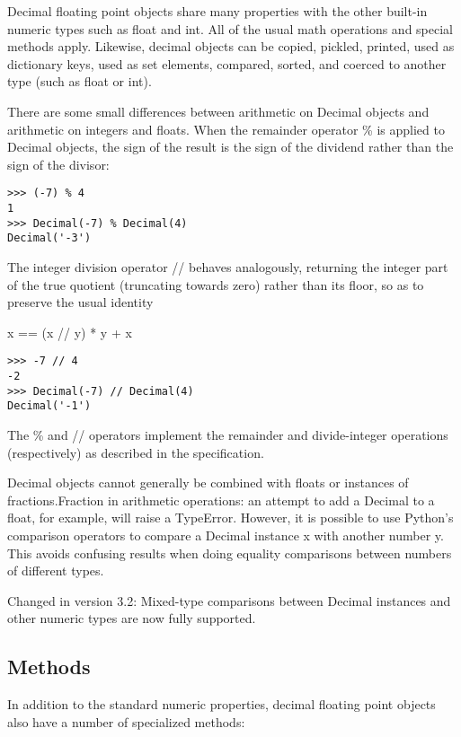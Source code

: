 \vpara
Decimal floating point objects share many properties with the other built-in numeric types such as float and int. All of the usual math operations and special methods apply. Likewise, decimal objects can be copied, pickled, printed, used as dictionary keys, used as set elements, compared, sorted, and coerced to another type (such as float or int).

\vpara
There are some small differences between arithmetic on Decimal objects and arithmetic on integers and floats. When the remainder operator \% is applied to Decimal objects, the sign of the result is the sign of the dividend rather than the sign of the divisor:

\begin{lstlisting}
>>> (-7) % 4
1
>>> Decimal(-7) % Decimal(4)
Decimal('-3')
\end{lstlisting}

The integer division operator // behaves analogously, returning the integer part of the true quotient (truncating towards zero) rather than its floor, so as to preserve the usual identity 

x == (x // y) * y + x %

\begin{lstlisting}
>>> -7 // 4
-2
>>> Decimal(-7) // Decimal(4)
Decimal('-1')
\end{lstlisting}

The \% and // operators implement the remainder and divide-integer operations (respectively) as described in the specification.

\vpara
Decimal objects cannot generally be combined with floats or instances of fractions.Fraction in arithmetic operations: an attempt to add a Decimal to a float, for example, will raise a TypeError. However, it is possible to use Python's comparison operators to compare a Decimal instance x with another number y. This avoids confusing results when doing equality comparisons between numbers of different types.


Changed in version 3.2: Mixed-type comparisons between Decimal instances and other numeric types are now fully supported.



\subsection{Methods}
In addition to the standard numeric properties, decimal floating point objects also have a number of specialized methods:


